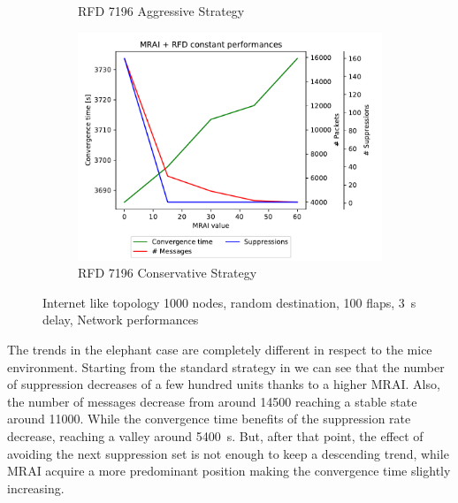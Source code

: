\begin{figure}[h]
\begin{subfigure}[b]{0.49\textwidth}
         \caption{RFD 7196 Aggressive Strategy}
         \label{fig:1000_7196RFDA_multiMRAI_elephants}
     \end{subfigure}
     \begin{subfigure}[b]{0.49\textwidth}
         \centering
         \includegraphics[width=\textwidth]{images/RFD/miceVSelephants/MultiMRAI/elephants/cisco_1000_RFD_7196_conservative-constant_mrai_rfd_evolution.pdf}
         \caption{RFD 7196 Conservative Strategy}
         \label{fig:1000_7196RFDC_multiMRAI_elephants}
     \end{subfigure}
		\caption{Internet like topology \num{1000} nodes, random destination, \num{100} flaps, \SI{3}{\second} delay, Network performances}
        \label{fig:1000_RFD_multiMRAI_elephants}
\end{figure}

The trends in the elephant case are completely different in respect to the
mice environment.
Starting from the standard strategy in 
we can see that the number of suppression decreases of a few hundred units
thanks to a higher \ac{MRAI}.
Also, the number of messages decrease from around \num{14500} reaching a stable
state around \num{11000}.
While the convergence time benefits of the suppression rate decrease, reaching
a valley around \SI{5400}{\second}.
But, after that point, the effect of avoiding the next suppression set is not enough to keep
a descending trend, while \ac{MRAI} acquire a more predominant position making
the convergence time slightly increasing.

